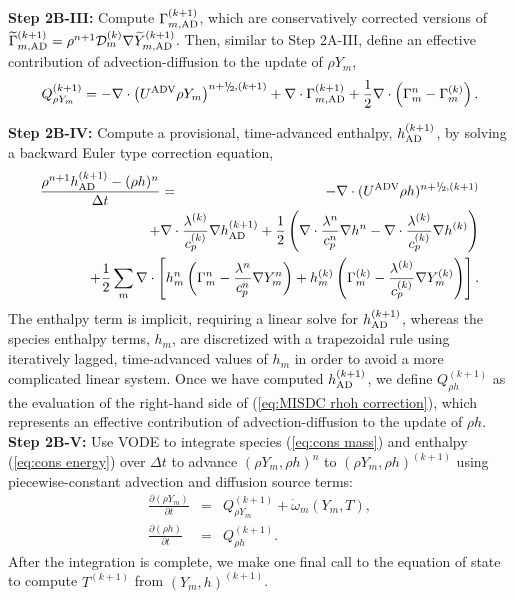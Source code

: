 {\bf Step 2B-III:} Compute $\Gamma_{m,{\rm AD}}^{(k+1)}$, which are conservatively corrected versions of 
$\widetilde\Gamma_{m,{\rm AD}}^{(k+1)} = \rho^{n+1}\mathcal D_m^{(k)}\nabla\widetilde Y_{m,{\rm AD}}^{(k+1)}$.
Then, similar to Step 2A-III, define an effective contribution of advection-diffusion to the update of $\rho Y_m$,
\begin{equation}
Q_{\rho Y_m}^{(k+1)} = -\nabla\cdot\left(\uadv\rho Y_m\right)^{n+\myhalf,(k+1)} + \nabla\cdot\Gamma_{m,{\rm AD}}^{(k+1)} + \half\nabla\cdot\left(\Gamma_m^n - \Gamma_m^{(k)}\right).
\end{equation}

{\bf Step 2B-IV:} Compute a provisional, time-advanced enthalpy, $h_{\rm AD}^{(k+1)}$, by solving a backward Euler type correction equation,
\begin{eqnarray}
\frac{\rho^{n+1}h_{\rm AD}^{(k+1)} - (\rho h)^n}{\Delta t} &=& -\nabla\cdot(\uadv\rho h)^{n+\myhalf,(k+1)}\nonumber\\
&&\hspace{-2.5cm}+ \nabla\cdot\frac{\lambda^{(k)}}{c_p^{(k)}}\nabla  h_{\rm AD}^{(k+1)} + \half\left(\nabla\cdot\frac{\lambda^n}{c_p^n}\nabla h^n - \nabla\cdot\frac{\lambda^{(k)}}{c_p^{(k)}}\nabla h^{(k)}\right)\nonumber\\
&&\hspace{-2.5cm}+ \half\sum_m\nabla\cdot\left[h_m^n\left(\Gamma_m^n - \frac{\lambda^n}{c_p^n}\nabla Y_m^n\right) + h_m^{(k)}\left(\Gamma_m^{(k)} - \frac{\lambda^{(k)}}{c_p^{(k)}}\nabla Y_m^{(k)}\right)\right].
\label{eq:MISDC rhoh correction}
\end{eqnarray}
The enthalpy term is implicit, requiring a linear solve for $h_{\rm AD}^{(k+1)}$, whereas the 
species enthalpy terms, $h_m$, are discretized with a trapezoidal rule using iteratively lagged, 
time-advanced values of $h_m$ in order to avoid a more complicated linear system.
Once we have computed $h_{\rm AD}^{(k+1)}$, we define
$Q_{\rho h}^{(k+1)}$ as the evaluation of the right-hand side of (\ref{eq:MISDC rhoh correction}),
which represents an effective contribution of advection-diffusion to the update of $\rho h$.\\

{\bf Step 2B-V:} Use VODE to integrate species (\ref{eq:cons mass}) and enthalpy (\ref{eq:cons energy}) over $\Delta t$
to advance $(\rho Y_m,\rho h)^n$ to $(\rho Y_m,\rho h)^{(k+1)}$ using piecewise-constant
advection and diffusion source terms:
\begin{eqnarray}
\frac{\partial(\rho Y_m)}{\partial t} &=& Q_{\rho Y_m}^{(k+1)} + \dot\omega_m(Y_m,T),\label{eq:MISDC VODE 3}\\
\frac{\partial(\rho h)}{\partial t} &=& Q_{\rho h}^{(k+1)}.\label{eq:MISDC VODE 4}
\end{eqnarray}
After the integration is complete, we make one final call to the equation of state
to compute $T^{(k+1)}$ from $(Y_m,h)^{(k+1)}$.\\

